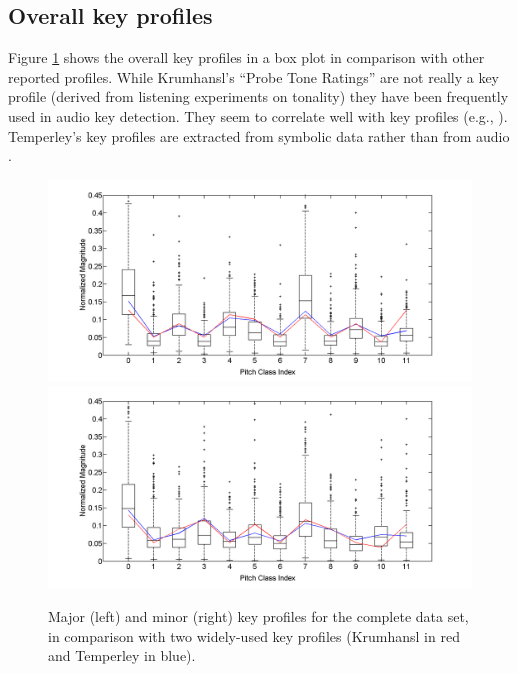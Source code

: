 \documentclass{article}
\begin{document}
\subsection{Overall key profiles}
Figure \ref{fig:OverallKeyProfiles} shows the overall key profiles in a box plot in comparison with other reported profiles. 
While Krumhansl's ``Probe Tone Ratings'' \cite{krumhansl_cognitive_1990} are not really a key profile (derived from listening experiments on tonality) they have been frequently used in audio key detection. They seem to correlate well with key profiles (e.g., \cite{izmirli_template_2005}). 
Temperley's key profiles are extracted from symbolic data  rather than from audio \cite{temperley_bayesian_2004,temperley_pitch-class_2008}.
\begin{figure}[tb]
\centering
    \includegraphics[scale=.2]{graph/allMajChroma+Krum+Temp}
    \includegraphics[scale=.2]{graph/allMinChroma+Krum+Temp}
	\caption{Major (left) and minor (right) key profiles for the complete data set, in comparison with two widely-used key profiles (Krumhansl in red and Temperley in blue).}
	\label{fig:OverallKeyProfiles}
\end{figure}
\end{document}
